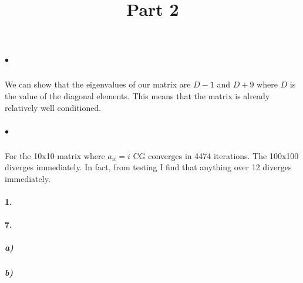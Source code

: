 \documentclass[12pt]{article}
\begin{document}
	\subparagraph{$\bullet$}
		We can show that the eigenvalues of our matrix are $D-1$ and $D+9$ where $D$ is the value of the diagonal elements. This means that the matrix is already relatively well conditioned.
	
	\subparagraph{$\bullet$}	
		For the 10x10 matrix where $a_{ii} = i$ CG converges in 4474 iterations. The 100x100 diverges immediately. In fact, from testing I find that anything over 12 diverges immediately.
	
		
	
\newpage	
\title{\textbf{Part 2}}

\paragraph{1.}

	
\paragraph{7.}
	\subparagraph{a)}

	
	\subparagraph{b)}
	
	
\end{document}
